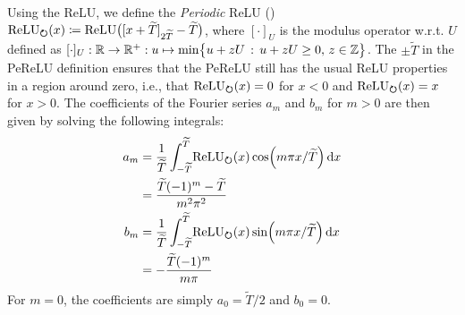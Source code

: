 Using the ReLU, we define the \emph{Periodic} \ac{ReLU} () $\operatorname{ReLU}_{\bm{\circlearrowright}}(x) \coloneqq \operatorname{ReLU}\bigl([x + \widetilde{T}]_{2\widetilde{T}} - \widetilde{T}\bigr)$, where $[\cdot]_U$ is the modulus operator w.r.t. $U$ defined as $[\cdot]_U : \mathbb{R} \to \mathbb{R}^+ : u \mapsto \min\bigl\{ u + zU \,:\, u + zU \geq 0,\, z \in \mathbb{Z} \bigr\}$.
The $\pm \tilde{T}$ in the \ac{PeReLU} definition ensures that the \ac{PeReLU} still has the usual \ac{ReLU} properties in a region around zero, i.e., that $\operatorname{ReLU}_{\bm{\circlearrowright}}(x) = 0$ for $x < 0$ and $\operatorname{ReLU}_{\bm{\circlearrowright}}(x) = x$ for $x > 0$.
The coefficients of the Fourier series $a_m$ and $b_m$ for $m > 0$ are then given by solving the following integrals:
\begin{align}
    a_m &= \frac{1}{\widetilde{T}} \int_{-\widetilde{T}}^{\widetilde{T}}\! \operatorname{ReLU}_{\bm{\circlearrowright}}(x) \cos(m \pi x / \widetilde{T}) \dd{x} \\
        &= \frac{\widetilde{T} (-1)^m - \widetilde{T}}{m^2\pi^2} \\
    b_m &= \frac{1}{\widetilde{T}} \int_{-\widetilde{T}}^{\widetilde{T}}\! \operatorname{ReLU}_{\bm{\circlearrowright}}(x) \sin(m \pi x / \widetilde{T}) \dd{x} \\
        &= -\frac{\widetilde{T} (-1)^m}{m \pi}
\end{align}
For $m = 0$, the coefficients are simply $a_0 = \tilde{T}/2$ and $b_0 = 0$.
